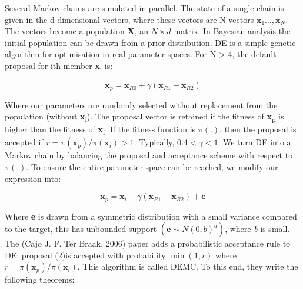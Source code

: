 \documentclass[a4paper]{article}
\begin{document}
Several Markov chains are simulated in parallel. The state of a single chain is given in the d-dimensional vectors, where these vectors are N vectors \(\mathbf{x}_1...,\mathbf{x}_N\). The vectors become a population \textbf{X}, an \(N \times d\) matrix. In Bayesian analysis the initial population can be drawn from a prior distribution. DE is a simple genetic algorithm for optimisation in real parameter spaces. For N > 4, the default proposal for ith member \textbf{x}\textsubscript{i} is:

\[\mathbf{x}_p = \mathbf{x}_{R0} + \gamma (\mathbf{x}_{R1} - \mathbf{x}_{R2}) \]

Where our parameters are randomly selected without replacement from the population (without \textbf{x}\textsubscript{i}). The proposal vector is retained if the fitness of \textbf{x}\textsubscript{p} is higher than the fitness of \textbf{x}\textsubscript{i}. If the fitness function is \(\pi(.)\), then the proposal is accepted if \(r = \pi(\mathbf{x}_p) / \pi(\mathbf{x}_i) > 1\). Typically, \(0.4 < \gamma < 1\). We turn DE into a Markov chain by balancing the proposal and acceptance scheme with respect to \(\pi (.)\). To ensure the entire parameter space can be reached, we modify our expression into:

\[\mathbf{x}_p = \mathbf{x}_i + \gamma (\mathbf{x}_{R1} - \mathbf{x}_{R2}) + \mathbf{e} \]

Where \textbf{e} is drawn from a symmetric distribution with a small variance compared to the target, this has unbounded support \((\textbf{e} \sim N(0, b)^d)\), where \emph{b} is small. The (Cajo J. F. Ter Braak, 2006) paper adds a probabilistic acceptance rule to DE: proposal (2)is accepted with probability \(\min (1, r)\) where \(r = \pi (\mathbf{x}_p) / \pi (\mathbf{x}_i)\). This algorithm is called DEMC. To this end, they write the following theorems:
\end{document}
